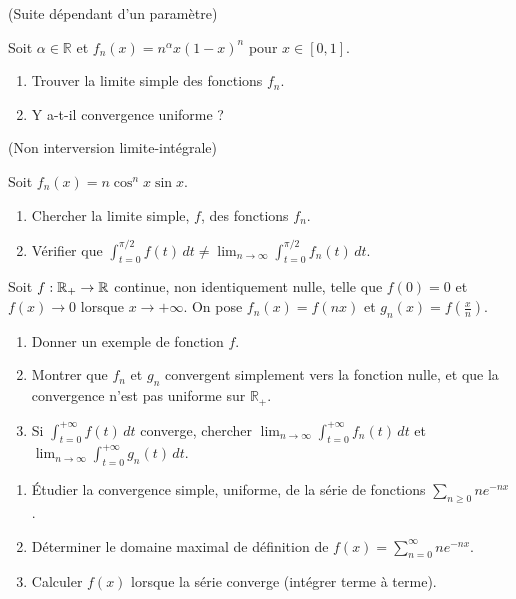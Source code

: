 \documentclass[a4paper,11pt,reqno]{amsart}
\begin{document}
\begin{exo} (Suite dépendant d'un paramètre)

  Soit $\alpha \in \mathbb{R}$ et $f_n(x) = n^\alpha x(1-x)^n$ pour $x \in {[0,1]}$.
  \begin{enumerate}
    \item Trouver la limite simple des fonctions $f_n$.
    \item Y a-t-il convergence uniforme ?
  \end{enumerate}
\end{exo}


\begin{exo} (Non interversion limite-intégrale)

  Soit $f_n(x) = n\cos^nx\sin x$.
  \begin{enumerate}
    \item Chercher la limite simple, $f$, des fonctions $f_n$.
    \item Vérifier que $ \int_{t=0}^{\pi/2} f(t)\,d t\ne \lim_{n\to\infty}  \int_{t=0}^{\pi/2} f_n(t)\,d t$.
  \end{enumerate}
\end{exo}


\begin{exo}

  Soit $f : {\mathbb{R}_{+}} \to \mathbb{R}$ continue, non identiquement nulle, telle que $f(0) = 0$ et $f(x) \to 0$ lorsque $x\to+\infty$. On pose $f_n(x) = f(nx)$ et $g_n(x) = f\left(\frac{x}{n}\right)$.

  \begin{enumerate}
    \item Donner un exemple de fonction $f$.
    \item Montrer que $f_n$ et $g_n$ convergent simplement vers la fonction nulle,
      et que la convergence n'est pas uniforme sur $\mathbb{R}_{+}$.
    \item Si $ \int_{t=0}^{+\infty} f(t)\,d t$ converge, chercher
         $\lim_{n\to\infty}  \int_{t=0}^{+\infty} f_n(t)\,d t$ et
         $\lim_{n\to\infty}  \int_{t=0}^{+\infty} g_n(t)\,d t$.
  \end{enumerate}
\end{exo}


\begin{exo}

  \begin{enumerate}
    \item Étudier la convergence simple, uniforme, de la série de fonctions $\sum_{n\geq 0} ne^{-nx}$.
    \item Déterminer le domaine maximal de définition de $f(x) = \sum_{n=0}^\infty ne^{-nx}$.
    \item Calculer $f(x)$ lorsque la série converge (intégrer terme à terme).
  \end{enumerate}
\end{exo}
\end{document}
